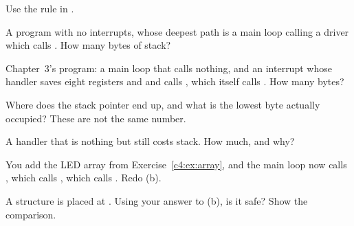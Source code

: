 \label{c4:ex:depth}
Use the rule in .
\begin{parts}
  \item A program with no interrupts, whose deepest path is a main loop calling a driver which
    calls . How many bytes of stack?
  \item Chapter~3's program: a main loop that calls nothing, and an interrupt whose handler saves
    eight registers and  and calls , which itself calls
    . How many bytes?
  \item Where does the stack pointer end up, and what is the lowest byte actually occupied? These
    are not the same number.
  \item A handler that is nothing but  still costs stack. How much, and why?
  \item You add the LED array from Exercise~\ref{c4:ex:array}, and the main loop now calls
    , which calls , which calls . Redo (b).
  \item A structure is placed at . Using your answer to (b), is it safe? Show the
    comparison.
\end{parts}

